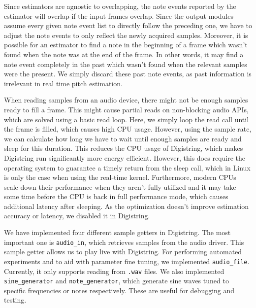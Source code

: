 \documentclass[a4paper,10pt,twocolumn]{article}
\begin{document}
Since estimators are agnostic to overlapping, the note events reported by the estimator will overlap if the input frames overlap. Since the output modules assume every given note event list to directly follow the preceding one, we have to adjust the note events to only reflect the newly acquired samples. Moreover, it is possible for an estimator to find a note in the beginning of a frame which wasn't found when the note was at the end of the frame. In other words, it may find a note event completely in the past which wasn't found when the relevant samples were the present. We simply discard these past note events, as past information is irrelevant in real time pitch estimation.

When reading samples from an audio device, there might not be enough samples ready to fill a frame. This might cause partial reads on non-blocking audio APIs, which are solved using a basic read loop. Here, we simply loop the read call until the frame is filled, which causes high CPU usage. However, using the sample rate, we can calculate how long we have to wait until enough samples are ready and sleep for this duration. This reduces the CPU usage of Digistring, which makes Digistring run significantly more energy efficient. However, this does require the operating system to guarantee a timely return from the sleep call, which in Linux is only the case when using the real-time kernel. Furthermore, modern CPUs scale down their performance when they aren't fully utilized and it may take some time before the CPU is back in full performance mode, which causes additional latency after sleeping. As the optimization doesn't improve estimation accuracy or latency, we disabled it in Digistring.

We have implemented four different sample getters in Digistring. The most important one is \texttt{audio\_in}, which retrieves samples from the audio driver. This sample getter allows us to play live with Digistring. For performing automated experiments and to aid with parameter fine tuning, we implemented \texttt{audio\_file}. Currently, it only supports reading from \texttt{.wav} files. We also implemented \texttt{sine\_generator} and \texttt{note\_generator}, which generate sine waves tuned to specific frequencies or notes respectively. These are useful for debugging and testing. %
\end{document}
